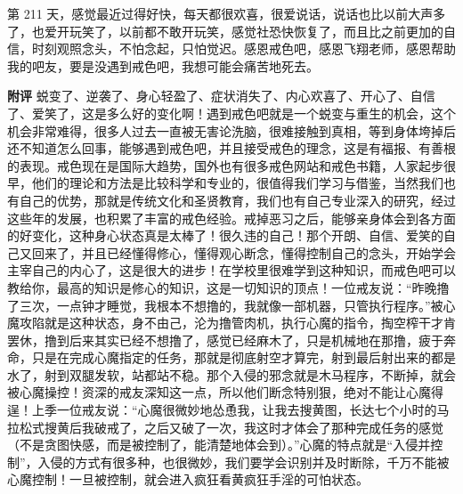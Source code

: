 \begin{case}
    第 211 天，感觉最近过得好快，每天都很欢喜，很爱说话，说话也比以前大声多了，也爱开玩笑了，以前都不敢开玩笑，感觉社恐快恢复了，而且比之前更加的自信，时刻观照念头，不怕念起，只怕觉迟。感恩戒色吧，感恩飞翔老师，感恩帮助我的吧友，要是没遇到戒色吧，我想可能会痛苦地死去。

    \textbf{附评} 蜕变了、逆袭了、身心轻盈了、症状消失了、内心欢喜了、开心了、自信了、爱笑了，这是多么好的变化啊！遇到戒色吧就是一个蜕变与重生的机会，这个机会非常难得，很多人过去一直被无害论洗脑，很难接触到真相，等到身体垮掉后还不知道怎么回事，能够遇到戒色吧，并且接受戒色的理念，这是有福报、有善根的表现。戒色现在是国际大趋势，国外也有很多戒色网站和戒色书籍，人家起步很早，他们的理论和方法是比较科学和专业的，很值得我们学习与借鉴，当然我们也有自己的优势，那就是传统文化和圣贤教育，我们也有自己专业深入的研究，经过这些年的发展，也积累了丰富的戒色经验。戒掉恶习之后，能够亲身体会到各方面的好变化，这种身心状态真是太棒了！很久违的自己！那个开朗、自信、爱笑的自己又回来了，并且已经懂得修心，懂得观心断念，懂得控制自己的念头，开始学会主宰自己的内心了，这是很大的进步！在学校里很难学到这种知识，而戒色吧可以教给你，最高的知识是修心的知识，这是一切知识的顶点！一位戒友说：“昨晚撸了三次，一点钟才睡觉，我根本不想撸的，我就像一部机器，只管执行程序。”被心魔攻陷就是这种状态，身不由己，沦为撸管肉机，执行心魔的指令，掏空榨干才肯罢休，撸到后来其实已经不想撸了，感觉已经麻木了，只是机械地在那撸，疲于奔命，只是在完成心魔指定的任务，那就是彻底射空才算完，射到最后射出来的都是水了，射到双腿发软，站都站不稳。那个入侵的邪念就是木马程序，不断掉，就会被心魔操控！资深的戒友深知这一点，所以他们断念特别狠，绝对不能让心魔得逞！上季一位戒友说：“心魔很微妙地怂恿我，让我去搜黄图，长达七个小时的马拉松式搜黄后我破戒了，之后又破了一次，我这时才体会了那种完成任务的感觉（不是贪图快感，而是被控制了，能清楚地体会到）。”心魔的特点就是“入侵并控制”，入侵的方式有很多种，也很微妙，我们要学会识别并及时断除，千万不能被心魔控制！一旦被控制，就会进入疯狂看黄疯狂手淫的可怕状态。
\end{case}

